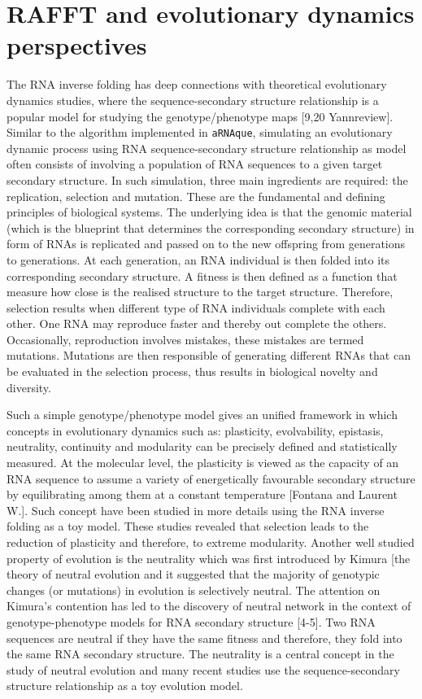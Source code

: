 \section{RAFFT and evolutionary dynamics perspectives}
The RNA inverse folding has deep connections with theoretical evolutionary dynamics studies, where the sequence-secondary structure relationship is a popular model for studying the genotype/phenotype maps [9,20 Yannreview].  Similar to the algorithm implemented in \texttt{aRNAque}, simulating an evolutionary dynamic process using RNA sequence-secondary structure relationship as model often consists of involving a population of RNA sequences to a given target secondary structure. In such simulation, three main ingredients are required: the replication, selection and mutation. These are the fundamental and defining principles of biological systems. The underlying idea is that the genomic material (which is the blueprint that determines the corresponding secondary structure) in form of RNAs is replicated and passed on to the new offspring from generations to generations. At each generation, an RNA individual is then folded into its corresponding secondary structure. A fitness is then defined as a function that measure how close is the realised structure to the target structure. Therefore, selection results when different type of RNA individuals complete with each other. One RNA may reproduce faster and thereby out complete the others. Occasionally, reproduction involves mistakes, these mistakes are termed mutations. Mutations are then responsible of generating different RNAs that can be evaluated in the selection process, thus results in biological novelty and diversity. 

Such a simple genotype/phenotype model gives an unified framework in which concepts in evolutionary dynamics such as: plasticity, evolvability, epistasis, neutrality, continuity and modularity can be precisely defined and statistically measured. At the molecular level, the plasticity is viewed as the capacity of an RNA sequence to assume a variety of energetically favourable secondary structure by equilibrating among them at a constant temperature [Fontana and Laurent W.]. Such concept have been studied in more details using the RNA inverse folding as a toy model. These studies revealed that selection leads to the reduction of plasticity and therefore, to extreme modularity. Another well studied property of evolution is the neutrality which was first introduced by Kimura [the theory of neutral evolution and it suggested that the majority of genotypic changes (or mutations) in evolution is selectively neutral. The attention on Kimura's contention has led to the discovery of neutral network in the context of  genotype-phenotype  models  for  RNA  secondary  structure [4-5]. Two RNA sequences are neutral if they have the same fitness and therefore, they fold into the same RNA secondary structure. The neutrality  is  a central concept in the study of neutral evolution and many recent studies use the sequence-secondary structure relationship as a toy evolution model. 

